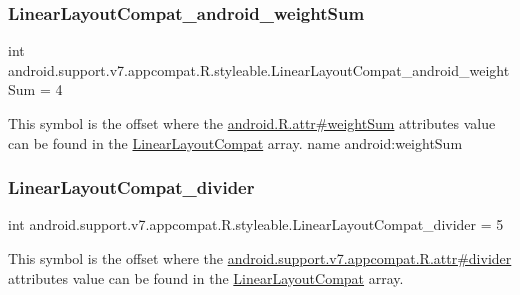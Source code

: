 \subsubsection{\texorpdfstring{Linear\+Layout\+Compat\+\_\+android\+\_\+weight\+Sum}{LinearLayoutCompat\_android\_weightSum}}
{\footnotesize\ttfamily int android.\+support.\+v7.\+appcompat.\+R.\+styleable.\+Linear\+Layout\+Compat\+\_\+android\+\_\+weight\+Sum = 4\hspace{0.3cm}{\ttfamily [static]}}

This symbol is the offset where the \hyperlink{}{android.\+R.\+attr\#weight\+Sum} attribute\textquotesingle{}s value can be found in the \hyperlink{classandroid_1_1support_1_1v7_1_1appcompat_1_1R_1_1styleable_a765d32873526b8c36de14b184094582d}{Linear\+Layout\+Compat} array.  name android\+:weight\+Sum \mbox{\label{classandroid_1_1support_1_1v7_1_1appcompat_1_1R_1_1styleable_aea914902102e3572b7009f55ad727a9b}} 
\subsubsection{\texorpdfstring{Linear\+Layout\+Compat\+\_\+divider}{LinearLayoutCompat\_divider}}
{\footnotesize\ttfamily int android.\+support.\+v7.\+appcompat.\+R.\+styleable.\+Linear\+Layout\+Compat\+\_\+divider = 5\hspace{0.3cm}{\ttfamily [static]}}

This symbol is the offset where the \hyperlink{classandroid_1_1support_1_1v7_1_1appcompat_1_1R_1_1attr_a8f75111bd93530bdbf366ffa149e524f}{android.\+support.\+v7.\+appcompat.\+R.\+attr\#divider} attribute\textquotesingle{}s value can be found in the \hyperlink{classandroid_1_1support_1_1v7_1_1appcompat_1_1R_1_1styleable_a765d32873526b8c36de14b184094582d}{Linear\+Layout\+Compat} array.

